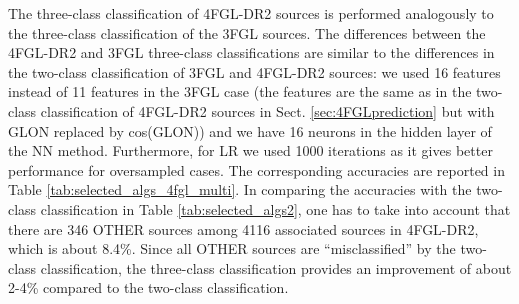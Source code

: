 \documentclass[referee]{aa} %
\begin{document}
\begin{table}[!h]
    \caption{
    Comparison of classes predicted for unassociated sources in the 3FGL catalog using three-class classification
    with associations in the 4FGL-DR2 catalog.}
    \label{tab:3FGL_vs_4FGL_3class}

\centering
{}
\end{table}



The three-class classification of 4FGL-DR2 sources is performed analogously to the three-class classification of the 3FGL sources.
The differences between the 4FGL-DR2 and 3FGL three-class classifications are similar to the differences in the two-class classification of 3FGL and 4FGL-DR2 sources:
we used 16 features instead of 11 features in the 3FGL case (the features are the same as in the two-class classification of 4FGL-DR2 sources in Sect. \ref{sec:4FGLprediction} but with GLON replaced by cos(GLON))
and we have 16 neurons in the hidden layer of the NN method. Furthermore, for LR we used 1000 iterations as it gives better performance for oversampled cases.
The corresponding accuracies are reported in Table \ref{tab:selected_algs_4fgl_multi}.
In comparing the accuracies with the two-class classification in Table \ref{tab:selected_algs2}, 
one has to take into account that there are 346 OTHER sources among 4116 associated sources in 4FGL-DR2, which is about 8.4\%.
Since all OTHER sources are ``misclassified'' by the two-class classification, the three-class classification provides an improvement of about 2-4\% compared to the two-class classification.
\end{document}
